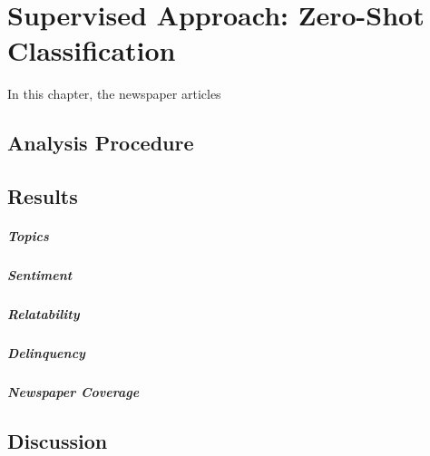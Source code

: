 \renewcommand{\imagepath}{../70-supervised/img}

\chapter{Supervised Approach: Zero-Shot Classification}
In this chapter, the newspaper articles 

\section{Analysis Procedure}

\section{Results}
\paragraph{Topics}
\paragraph{Sentiment}
\paragraph{Relatability}
\paragraph{Delinquency}
\paragraph{Newspaper Coverage}

\section{Discussion}